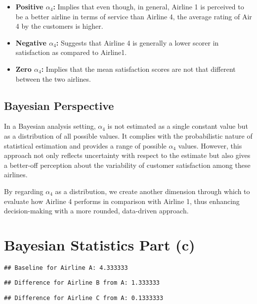 \documentclass[
]{article}
\providecommand{\tightlist}{%
  \setlength{\itemsep}{0pt}\setlength{\parskip}{0pt}}
\begin{document}
\begin{itemize}
\tightlist
\item
  \textbf{Positive \(\alpha_4\):} Implies that even though, in general,
  Airline 1 is perceived to be a better airline in terms of service than
  Airline 4, the average rating of Air 4 by the customers is higher.
\item
  \textbf{Negative \(\alpha_4\):} Suggests that Airline 4 is generally a
  lower scorer in satisfaction as compared to Airline1.
\item
  \textbf{Zero \(\alpha_4\):} Implies that the mean satisfaction scores
  are not that different between the two airlines.
\end{itemize}

\subsection{Bayesian Perspective}\label{bayesian-perspective}

In a Bayesian analysis setting, \(\alpha_4\) is not estimated as a
single constant value but as a distribution of all possible values. It
complies with the probabilistic nature of statistical estimation and
provides a range of possible \(\alpha_4\) values. However, this approach
not only reflects uncertainty with respect to the estimate but also
gives a better-off perception about the variability of customer
satisfaction among these airlines.

By regarding \(\alpha_4\) as a distribution, we create another dimension
through which to evaluate how Airline 4 performs in comparison with
Airline 1, thus enhancing decision-making with a more rounded,
data-driven approach.

\section{Bayesian Statistics Part (c)}\label{bayesian-statistics-part-c}

\begin{verbatim}
## Baseline for Airline A: 4.333333
\end{verbatim}

\begin{verbatim}
## Difference for Airline B from A: 1.333333
\end{verbatim}

\begin{verbatim}
## Difference for Airline C from A: 0.1333333
\end{verbatim}
\end{document}
